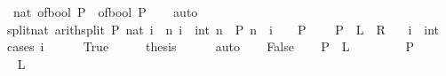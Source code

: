 \begin{isabellebody}
\ \ {\isachardoublequoteopen}nat\ {\isacharparenleft}{\kern0pt}of{\isacharunderscore}{\kern0pt}bool\ P{\isacharparenright}{\kern0pt}\ {\isacharequal}{\kern0pt}\ of{\isacharunderscore}{\kern0pt}bool\ P{\isachardoublequoteclose}\isanewline
%
\isadelimproof
\ \ %
\endisadelimproof
%
\isatagproof
{}\isamarkupfalse%
\ auto%
\endisatagproof
{\isafoldproof}%
%
\isadelimproof
\isanewline
%
\endisadelimproof
\isanewline
{}\isamarkupfalse%
\ split{\isacharunderscore}{\kern0pt}nat\ {\isacharbrackleft}{\kern0pt}arith{\isacharunderscore}{\kern0pt}split{\isacharbrackright}{\kern0pt}{\isacharcolon}{\kern0pt}\ {\isachardoublequoteopen}P\ {\isacharparenleft}{\kern0pt}nat\ i{\isacharparenright}{\kern0pt}\ {\isasymlongleftrightarrow}\ {\isacharparenleft}{\kern0pt}{\isacharparenleft}{\kern0pt}{\isasymforall}n{\isachardot}{\kern0pt}\ i\ {\isacharequal}{\kern0pt}\ int\ n\ {\isasymlongrightarrow}\ P\ n{\isacharparenright}{\kern0pt}\ {\isasymand}\ {\isacharparenleft}{\kern0pt}i\ {\isacharless}{\kern0pt}\ {}\ {\isasymlongrightarrow}\ P\ {}{\isacharparenright}{\kern0pt}{\isacharparenright}{\kern0pt}{\isachardoublequoteclose}\isanewline
\ \ {\isacharparenleft}{\kern0pt}\ {\isachardoublequoteopen}{\isacharquery}{\kern0pt}P\ {\isacharequal}{\kern0pt}\ {\isacharparenleft}{\kern0pt}{\isacharquery}{\kern0pt}L\ {\isasymand}\ {\isacharquery}{\kern0pt}R{\isacharparenright}{\kern0pt}{\isachardoublequoteclose}{\isacharparenright}{\kern0pt}\isanewline
\ \ \ i\ {\isacharcolon}{\kern0pt}{\isacharcolon}{\kern0pt}\ int\isanewline
%
\isadelimproof
%
\endisadelimproof
%
\isatagproof
{}\isamarkupfalse%
\ {\isacharparenleft}{\kern0pt}cases\ {\isachardoublequoteopen}i\ {\isacharless}{\kern0pt}\ {}{\isachardoublequoteclose}{\isacharparenright}{\kern0pt}\isanewline
\ \ \isamarkupfalse%
\ True\isanewline
\ \ \isamarkupfalse%
\ \isamarkupfalse%
\ {\isacharquery}{\kern0pt}thesis\isanewline
\ \ \ \ \isamarkupfalse%
\ auto\isanewline
{}\isamarkupfalse%
\isanewline
\ \ \isamarkupfalse%
\ False\isanewline
\ \ \isamarkupfalse%
\ {\isachardoublequoteopen}{\isacharquery}{\kern0pt}P\ {\isacharequal}{\kern0pt}\ {\isacharquery}{\kern0pt}L{\isachardoublequoteclose}\isanewline
\ \ \isamarkupfalse%
\isanewline
\ \ \ \ \isamarkupfalse%
\ {\isacharquery}{\kern0pt}P\isanewline
\ \ \ \ \isamarkupfalse%
\ \isamarkupfalse%
\ {\isacharquery}{\kern0pt}L\ \isamarkupfalse%

\end{isabellebody}
